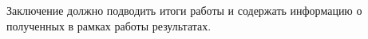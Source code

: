 
Заключение должно подводить итоги работы и содержать информацию о полученных в рамках работы результатах.